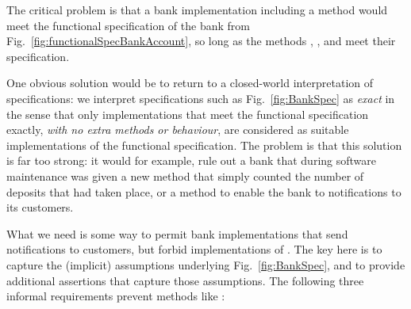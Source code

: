  
The critical problem is that a bank implementation including a 
method would meet the functional specification of the bank from
Fig.~\ref{fig:functionalSpecBankAccount}, so long as the methods ,
, and     meet
their specification.

One obvious solution would be to return to a closed-world
interpretation of specifications: we interpret specifications such as
Fig.~\ref{fig:BankSpec} as \emph{exact} in the sense that only
implementations that meet the functional specification exactly,
\emph{with no extra methods or behaviour}, are considered as suitable
implementations of the functional specification. The problem is that
this solution is far too strong: it would for example, rule out a bank
that  during software maintenance was given a new method 
that simply counted the number of deposits that had taken place, or a method 
to enable the bank to    notifications  to its customers.
%
%


What we need is some way to permit bank implementations that 
send notifications to customers, but forbid implementations of . %
The key here is to capture the (implicit)
assumptions underlying Fig.~\ref{fig:BankSpec}, and to provide
additional assertions that capture those assumptions.  The following
 three informal requirements   prevent methods like :

